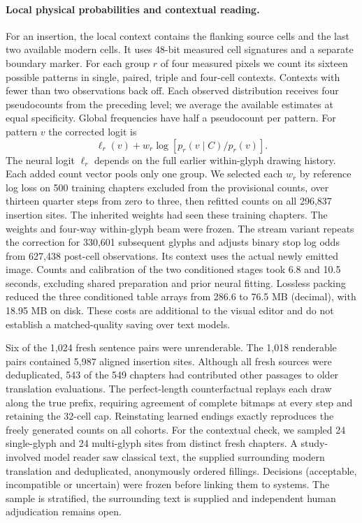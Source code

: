 \paragraph{Local physical probabilities and contextual reading.}
For an insertion, the local context contains the flanking source cells and the last two available modern cells. It uses 48-bit measured cell signatures and a separate boundary marker. For each group $r$ of four measured pixels we count its sixteen possible patterns in single, paired, triple and four-cell contexts. Contexts with fewer than two observations back off. Each observed distribution receives four pseudocounts from the preceding level; we average the available estimates at equal specificity. Global frequencies have half a pseudocount per pattern. For pattern $v$ the corrected logit is
\[
  \ell_r(v) + w_r\log\!\left[p_r(v\mid C)/p_r(v)\right].
\]
The neural logit $\ell_r$ depends on the full earlier within-glyph drawing history. Each added count vector pools only one group. We selected each $w_r$ by reference log loss on 500 training chapters excluded from the provisional counts, over thirteen quarter steps from zero to three, then refitted counts on all 296,837 insertion sites. The inherited weights had seen these training chapters. The weights and four-way within-glyph beam were frozen. The stream variant repeats the correction for 330,601 subsequent glyphs and adjusts binary stop log odds from 627,438 post-cell observations. Its context uses the actual newly emitted image. Counts and calibration of the two conditioned stages took 6.8 and 10.5 seconds, excluding shared preparation and prior neural fitting. Lossless packing reduced the three conditioned table arrays from 286.6 to 76.5 MB (decimal), with 18.95 MB on disk. These costs are additional to the visual editor and do not establish a matched-quality saving over text models.

Six of the 1,024 fresh sentence pairs were unrenderable. The 1,018 renderable pairs contained 5,987 aligned insertion sites. Although all fresh sources were deduplicated, 543 of the 549 chapters had contributed other passages to older translation evaluations. The perfect-length counterfactual replays each draw along the true prefix, requiring agreement of complete bitmaps at every step and retaining the 32-cell cap. Reinstating learned endings exactly reproduces the freely generated counts on all cohorts. For the contextual check, we sampled 24 single-glyph and 24 multi-glyph sites from distinct fresh chapters. A study-involved model reader saw classical text, the supplied surrounding modern translation and deduplicated, anonymously ordered fillings. Decisions (acceptable, incompatible or uncertain) were frozen before linking them to systems. The sample is stratified, the surrounding text is supplied and independent human adjudication remains open.
